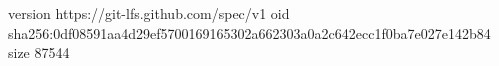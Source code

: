 version https://git-lfs.github.com/spec/v1
oid sha256:0df08591aa4d29ef5700169165302a662303a0a2c642ecc1f0ba7e027e142b84
size 87544
